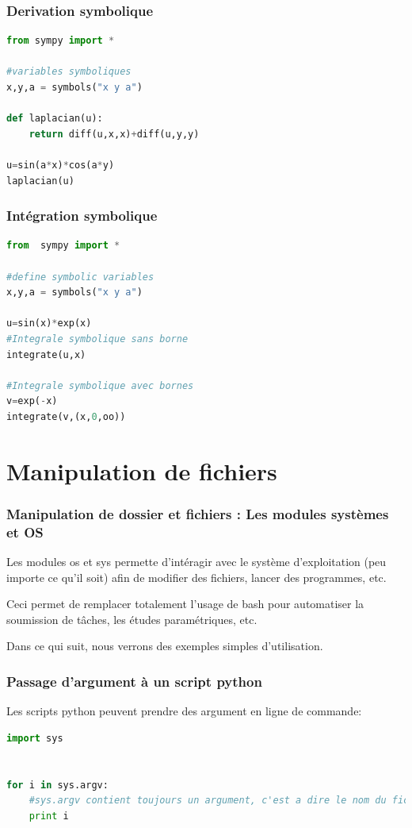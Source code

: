 \documentclass[]{beamer}
\begin{document}
\begin{frame}[fragile]
\frametitle{Derivation symbolique}
\begin{lstlisting}[language=Python]
from sympy import *

#variables symboliques
x,y,a = symbols("x y a")

def laplacian(u):
	return diff(u,x,x)+diff(u,y,y)

u=sin(a*x)*cos(a*y)
laplacian(u)
\end{lstlisting}
\end{frame}

\begin{frame}[fragile]
\frametitle{Intégration symbolique}
\begin{lstlisting}[language=Python]
from  sympy import *

#define symbolic variables
x,y,a = symbols("x y a")

u=sin(x)*exp(x)
#Integrale symbolique sans borne
integrate(u,x)

#Integrale symbolique avec bornes
v=exp(-x)
integrate(v,(x,0,oo))
\end{lstlisting}
\end{frame}




\section{Manipulation de fichiers}

\begin{frame}
\frametitle{Manipulation de dossier et fichiers : Les modules systèmes et OS}
Les modules os et sys permette d'intéragir avec le système d'exploitation (peu importe ce qu'il soit) afin de modifier des fichiers, lancer des programmes, etc.

Ceci permet de remplacer totalement l'usage de bash pour automatiser la soumission de tâches, les études paramétriques, etc.

Dans ce qui suit, nous verrons des exemples simples d'utilisation.
\end{frame}

\begin{frame}[fragile]
\frametitle{Passage d'argument à un script python}
Les scripts python peuvent prendre des argument en ligne de commande:
\begin{lstlisting}[language=Python]
import sys


for i in sys.argv:
	#sys.argv contient toujours un argument, c'est a dire le nom du fichier python
	print i



\end{lstlisting}
\end{frame}
\end{document}
